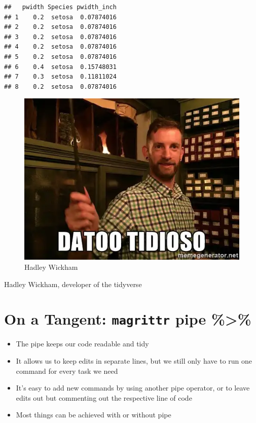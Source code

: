 \documentclass[
]{book}
\providecommand{\tightlist}{%
  \setlength{\itemsep}{0pt}\setlength{\parskip}{0pt}}
\begin{document}
\begin{verbatim}
##   pwidth Species pwidth_inch
## 1    0.2  setosa  0.07874016
## 2    0.2  setosa  0.07874016
## 3    0.2  setosa  0.07874016
## 4    0.2  setosa  0.07874016
## 5    0.2  setosa  0.07874016
## 6    0.4  setosa  0.15748031
## 7    0.3  setosa  0.11811024
## 8    0.2  setosa  0.07874016
\end{verbatim}

\begin{figure}
\centering
\includegraphics{./img/hadley-meme.webp}
\caption{Hadley Wickham}
\end{figure}

Hadley Wickham, developer of the tidyverse

\section{\texorpdfstring{On a Tangent: \texttt{magrittr} pipe \%\textgreater\%}{On a Tangent: magrittr pipe \%\textgreater\%}}\label{on-a-tangent-magrittr-pipe}

\begin{itemize}
\tightlist
\item
  The pipe keeps our code readable and tidy
\item
  It allows us to keep edits in separate lines, but we still only have to run one command for every task we need
\item
  It's easy to add new commands by using another pipe operator, or to leave edits out but commenting out the respective line of code
\item
  Most things can be achieved with or without pipe
\end{itemize}
\end{document}
